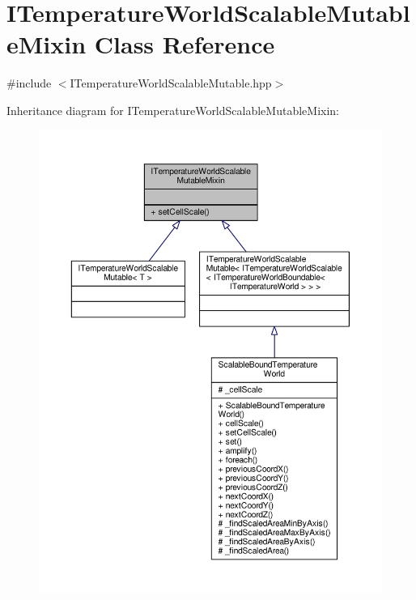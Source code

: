 \hypertarget{class_i_temperature_world_scalable_mutable_mixin}{\section{I\-Temperature\-World\-Scalable\-Mutable\-Mixin Class Reference}
\label{class_i_temperature_world_scalable_mutable_mixin}
}


{\ttfamily \#include $<$I\-Temperature\-World\-Scalable\-Mutable.\-hpp$>$}



Inheritance diagram for I\-Temperature\-World\-Scalable\-Mutable\-Mixin\-:
\nopagebreak
\begin{figure}[H]
\begin{center}
\leavevmode
\includegraphics[width=350pt]{class_i_temperature_world_scalable_mutable_mixin__inherit__graph}
\end{center}
\end{figure}


